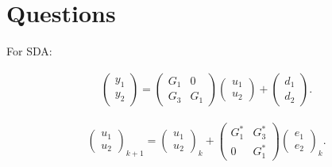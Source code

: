 \chapter{Questions} 


For SDA: 

\begin{align}
\begin{pmatrix}
y_1 \\ y_2
\end{pmatrix} = \begin{pmatrix}
G_1 & 0 \\ G_3 & G_1
\end{pmatrix}\begin{pmatrix}
u_1 \\ u_2 
\end{pmatrix} + \begin{pmatrix}
d_1\\d_2
\end{pmatrix}.
\end{align}

\begin{align}
\begin{pmatrix}
u_1 \\ u_2
\end{pmatrix}_{k+1} =
\begin{pmatrix}
u_1 \\ u_2
\end{pmatrix}_k + 
\begin{pmatrix}
G_1^* & G_3^* \\0 & G_1^*
\end{pmatrix}\begin{pmatrix}
e_1 \\ e_2
\end{pmatrix}_k.
\end{align}






